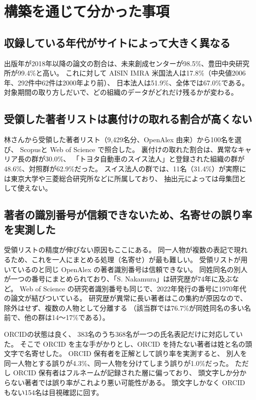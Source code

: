 \documentclass[a4paper,10pt]{ltjsarticle}
\begin{document}
\section{構築を通じて分かった事項}

\subsection{収録している年代がサイトによって大きく異なる}

出版年が2018年以降の論文の割合は、未来創成センターが98.5\%、豊田中央研究所が99.4\%と高い。
これに対して AISIN IMRA 米国法人は17.8\%（中央値2006年、292件中62件は2000年より前）、
日本法人は51.9\%、全体では67.0\%である。
対象期間の取り方しだいで、どの組織のデータがどれだけ残るかが変わる。

\subsection{受領した著者リストは裏付けの取れる割合が高くない}

林さんから受領した著者リスト（9,429名分、OpenAlex 由来）から100名を選び、
Scopusと Web of Science で照合した。
裏付けの取れた割合は、異常なキャリア長の群が30.0\%、
「トヨタ自動車のスイス法人」と登録された組織の群が48.6\%、対照群が62.9\%だった。
スイス法人の群では、11名（31.4\%）が実際には東京大学や三菱総合研究所などに所属しており、
抽出元によっては母集団として使えない。

\subsection{著者の識別番号が信頼できないため、名寄せの誤り率を実測した}

受領リストの精度が伸びない原因もここにある。
同一人物が複数の表記で現れるため、これを一人にまとめる処理（名寄せ）が最も難しい。
受領リストが用いているのと同じ OpenAlex の著者識別番号は信頼できない。
同姓同名の別人が一つの番号にまとめられており、「S. Nakamura」は研究歴が74年に及ぶなど。
Web of Science の研究者識別番号も同じで、2022年発行の番号に1970年代の論文が結びついている。
研究歴が異常に長い著者はこの集約が原因なので、除外はせず、複数の人物として分離する
（該当群では76.7\%が同姓同名の多い名前で、他の群は14〜17\%である）。

ORCIDの状態は良く、
383名のうち368名が一つの氏名表記だけに対応していた。
そこで ORCID を主な手がかりとし、ORCID を持たない著者は姓と名の頭文字で名寄せした。
ORCID 保有者を正解として誤り率を実測すると、
別人を同一人物とする誤りが4.3\%、同一人物を分けてしまう誤りが1.0\%だった。
ただし ORCID 保有者はフルネームが記録された層に偏っており、
頭文字しか分からない著者では誤り率がこれより悪い可能性がある。
頭文字しかなく ORCID もない154名は目視確認に回す。
\end{document}
